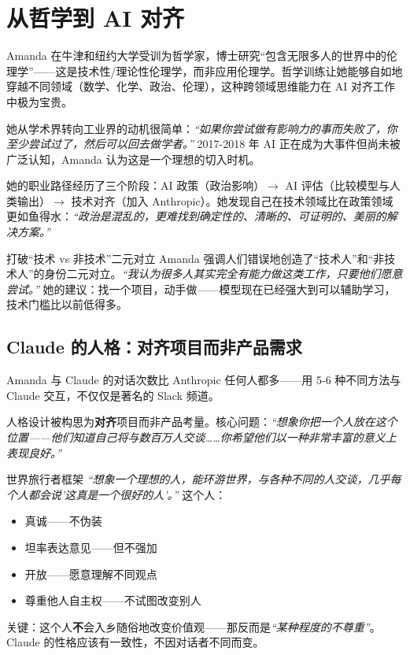 \section{从哲学到 AI 对齐}

Amanda 在牛津和纽约大学受训为哲学家，博士研究``包含无限多人的世界中的伦理学''——这是技术性/理论性伦理学，而非应用伦理学。哲学训练让她能够自如地穿越不同领域（数学、化学、政治、伦理），这种跨领域思维能力在 AI 对齐工作中极为宝贵。

她从学术界转向工业界的动机很简单：\textit{``如果你尝试做有影响力的事而失败了，你至少尝试过了，然后可以回去做学者。''} 2017-2018 年 AI 正在成为大事件但尚未被广泛认知，Amanda 认为这是一个理想的切入时机。

她的职业路径经历了三个阶段：AI 政策（政治影响）$\to$ AI 评估（比较模型与人类输出）$\to$ 技术对齐（加入 Anthropic）。她发现自己在技术领域比在政策领域更如鱼得水：\textit{``政治是混乱的，更难找到确定性的、清晰的、可证明的、美丽的解决方案。''}

\begin{knowledgebox}{打破``技术 vs 非技术''二元对立}
Amanda 强调人们错误地创造了``技术人''和``非技术人''的身份二元对立。\textit{``我认为很多人其实完全有能力做这类工作，只要他们愿意尝试。''} 她的建议：找一个项目，动手做——模型现在已经强大到可以辅助学习，技术门槛比以前低得多。
\end{knowledgebox}

\subsection{Claude 的人格：对齐项目而非产品需求}

Amanda 与 Claude 的对话次数比 Anthropic 任何人都多——用 5-6 种不同方法与 Claude 交互，不仅仅是著名的 Slack 频道。

人格设计被构思为\textbf{对齐}项目而非产品考量。核心问题：\textit{``想象你把一个人放在这个位置——他们知道自己将与数百万人交谈……你希望他们以一种非常丰富的意义上表现良好。''}

\begin{importantbox}{世界旅行者框架}
\textit{``想象一个理想的人，能环游世界，与各种不同的人交谈，几乎每个人都会说'这真是一个很好的人'。''} 这个人：
\begin{itemize}
    \item 真诚——不伪装
    \item 坦率表达意见——但不强加
    \item 开放——愿意理解不同观点
    \item 尊重他人自主权——不试图改变别人
\end{itemize}

关键：这个人\textbf{不}会入乡随俗地改变价值观——那反而是\textit{``某种程度的不尊重''}。Claude 的性格应该有一致性，不因对话者不同而变。
\end{importantbox}

